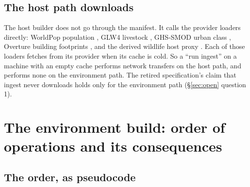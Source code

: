 \documentclass[11pt,a4paper]{article} \usepackage[utf8]{inputenc} \usepackage{lmodern} \usepackage[T1]{fontenc}
\begin{document}
\subsection{The host path downloads} \label{sec:hostdownloads}

The host builder does not go through the manifest. It calls the provider loaders directly:
WorldPop population , GLW4 livestock
, GHS-SMOD urban class
, Overture building footprints
, and the derived wildlife host proxy
. Each of those loaders fetches from its
provider when its cache is cold. So a ``run ingest'' on a machine with an empty cache performs
network transfers on the host path, and performs none on the environment path. The retired
specification's claim that ingest never downloads holds only for the environment path
(\S\ref{sec:open} question 1).

\section{The environment build: order of operations and its consequences} \label{sec:order}

\subsection{The order, as pseudocode}
\end{document}
